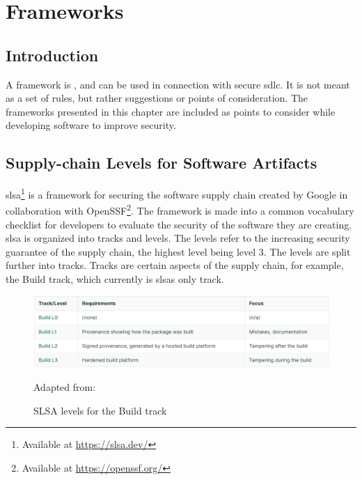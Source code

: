 \section{Frameworks}
\subsection{Introduction}
A framework is  \cite{FrameworkDefinition}, and can be used in connection with secure \acrshort{sdlc}. It is not meant as a set of rules, but rather suggestions or points of consideration. The frameworks presented in this chapter are included as points to consider while developing software to improve security. 

\subsection{Supply-chain Levels for Software Artifacts}
\acrlong{slsa}\footnote{Available at \url{https://slsa.dev/}} is a framework for securing the software supply chain created by Google in collaboration with OpenSSF\footnote{Available at \url{https://openssf.org/}}. The framework is made into a common vocabulary checklist for developers to evaluate the security of the software they are creating. \acrshort{slsa} is organized into tracks and levels. The levels refer to the increasing security guarantee of the supply chain, the highest level being level 3. The levels are split further into tracks. Tracks are certain aspects of the supply chain, for example, the Build track, which currently is \acrshort{slsa}s only track. \cite{SLSAgeneral}

\vspace{2mm}
\begin{figure}[H]
    \centering
    \includegraphics[width=0.8\columnwidth]{Images/slsalevels.png}
    \caption{SLSA levels for the Build track} Adapted from: \cite{SLSAlevels}
    \label{fig: SLSA levels for the Build track}
\end{figure}

